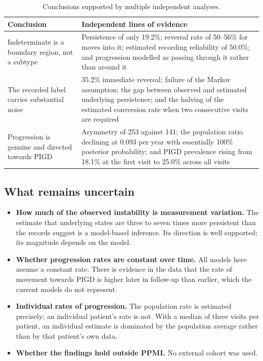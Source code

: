 \documentclass[11pt,a4paper]{article}
\begin{document}
\begin{table}[H]
\centering
\begin{tabular}{@{}p{6.0cm}p{8.2cm}@{}}
\toprule
\textbf{Conclusion} & \textbf{Independent lines of evidence} \\
\midrule
Indeterminate is a boundary region, not a subtype &
Persistence of only 19.2\%; reversal rate of 50--56\% for moves into it;
estimated recording reliability of 50.0\%; and progression modelled as passing
through it rather than around it \\
\addlinespace
The recorded label carries substantial noise &
35.2\% immediate reversal; failure of the Markov assumption; the gap between
observed and estimated underlying persistence; and the halving of the estimated
conversion rate when two consecutive visits are required \\
\addlinespace
Progression is genuine and directed towards PIGD &
Asymmetry of 253 against 141; the population ratio declining at 0.093 per year
with essentially 100\% posterior probability; and PIGD prevalence rising from
18.1\% at the first visit to 25.0\% across all visits \\
\bottomrule
\end{tabular}
\caption{Conclusions supported by multiple independent analyses.}
\end{table}

\subsection{What remains uncertain}

\begin{itemize}
  \item \textbf{How much of the observed instability is measurement variation.}
        The estimate that underlying states are three to seven times more
        persistent than the records suggest is a model-based inference. Its
        direction is well supported; its magnitude depends on the model.

  \item \textbf{Whether progression rates are constant over time.} All models
        here assume a constant rate. There is evidence in the data that the rate
        of movement towards PIGD is higher later in follow-up than earlier,
        which the current models do not represent.

  \item \textbf{Individual rates of progression.} The population rate is
        estimated precisely; an individual patient's rate is not. With a median
        of three visits per patient, an individual estimate is dominated by the
        population average rather than by that patient's own data.

  \item \textbf{Whether the findings hold outside PPMI.} No external cohort was
        used.
\end{itemize}
\end{document}
